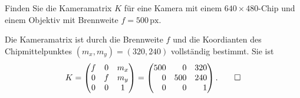 Finden Sie die Kameramatrix $K$ für eine Kamera mit einem $640\times 480$-Chip
und einem Objektiv mit Brennweite $f=500\,\text{px}$.

\begin{loesung}
Die Kameramatrix ist durch die Brennweite $f$ und die Koordianten
des Chipmittelpunktes $(m_x,m_y)=(320,240)$ vollständig bestimmt.
Sie ist
\[
K
=
\begin{pmatrix*}
f & 0 & m_x \\
0 & f & m_y \\
0 & 0 & 1
\end{pmatrix*}
=
\begin{pmatrix*}[r]
500 &   0 & 320 \\
  0 & 500 & 240 \\
  0 &   0 &   1
\end{pmatrix*}.
\qedhere
\]
\end{loesung}

